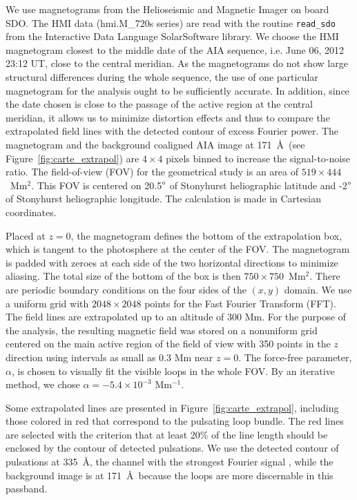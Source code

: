 \documentclass[preprint2]{aastex6}
\begin{document}
We use magnetograms from the Helioseismic and Magnetic Imager \citep[HMI;][]{scherrer2012} on board SDO. The HMI data (hmi.M\_720s series) are read with the routine \texttt{read\_sdo} from the Interactive Data Language SolarSoftware library. We choose the HMI magnetogram closest to the middle date of the AIA sequence, i.e. June 06, 2012 23:12 UT, close to the central meridian. As the magnetograms do not show large structural differences during the whole sequence, the use of one particular magnetogram for the analysis ought to be sufficiently accurate. In addition, since the date chosen is close to the passage of the active region at the central meridian, it allows us to minimize distortion effects and thus to compare the extrapolated field lines with the detected contour of excess Fourier power. The magnetogram and the background coaligned AIA image at 171~\AA~(see Figure~\ref{fig:carte_extrapol}) are $4 \times 4$ pixels binned to increase the signal-to-noise ratio.
The field-of-view (FOV) for the geometrical study is an area of $519 \times 444$~Mm$^{2}$. This FOV is centered on 20.5$\degree$ of Stonyhurst heliographic latitude and -2$\degree$ of Stonyhurst heliographic longitude. The calculation is made in Cartesian coordinates.

\medskip

Placed at  $z=0$, the magnetogram defines the bottom of the extrapolation box, which is tangent to the photosphere at the center of the FOV.
The magnetogram is padded with zeroes at each side of the two horizontal directions to minimize aliasing. The total size of the bottom of the box is then $750 \times 750$~Mm$^{2}$. There are periodic boundary conditions on the four sides of the $(x, y)$ domain.
We use a uniform grid with $ 2048 \times 2048$ points for the Fast Fourier Transform (FFT). The field lines are extrapolated up to an altitude of 300 Mm. 
For the purpose of the analysis, the resulting magnetic field was stored on a nonuniform grid centered on the main active region of the field of view with 350 points in the $z$ direction using intervals as small as 0.3 Mm near $z=0$. 
The force-free parameter, $\alpha$, is chosen to visually fit the visible loops in the whole FOV.
By an iterative method, we chose $\alpha = -5.4 \times 10^{-3}$ Mm$^{-1}$. 

\medskip

Some extrapolated lines are presented in Figure~\ref{fig:carte_extrapol}, including those colored in red that correspond to the pulsating loop bundle.  The red lines are selected with the criterion that at least 20\% of the line length should be enclosed by the contour of detected pulsations. We use the detected contour of pulsations at 335~\AA, the channel with the strongest Fourier signal \citep[][see Figure 4]{froment2015}, while the background image is at 171~\AA~because the loops are more discernable in this passband.
\end{document}
